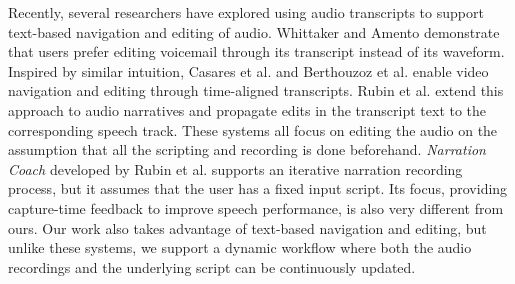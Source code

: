 Recently, several researchers have explored using audio transcripts to support text-based navigation and editing of audio. Whittaker and Amento \cite{whittaker2004semantic} demonstrate that users prefer editing voicemail through its transcript instead of its waveform. Inspired by similar intuition, Casares et al. \cite{casares2002simplifying} and Berthouzoz et al. \cite{berthouzoz2012tools} enable video navigation and editing through time-aligned transcripts. Rubin et al. \cite{rubin2013content} extend this approach to audio narratives and propagate edits in the transcript text to the corresponding speech track. These systems all focus on editing the audio on the assumption that all the scripting and recording is done beforehand. 
%
\textit{Narration Coach} developed by Rubin et al. 
supports an iterative narration recording process, but it assumes that the user has a fixed input script. Its focus, providing capture-time feedback to improve speech performance, is also very different from ours. Our work also takes advantage of text-based navigation and editing, but unlike these systems, we support a dynamic workflow where both the audio recordings and the underlying script can be continuously  updated.      